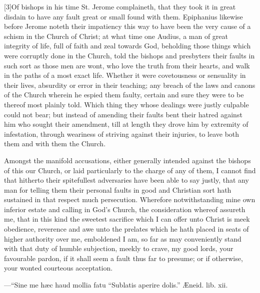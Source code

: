 [3]Of bishops in his time St. Jerome complaineth, that they took it in great disdain to have any fault great or small found with them. Epiphanius likewise before Jerome noteth their impatiency this way to have been the very cause of a schism in the Church of Christ; at what time one Audius, a man of great integrity of life, full of faith and zeal towards God, beholding those things which were corruptly done in the Church, told the bishops and presbyters their faults in such sort as those men are wont, who love the truth from their  hearts, and walk in the paths of a most exact life. Whether it were covetousness or sensuality in their lives, absurdity or error in their teaching; any breach of the laws and canons of the Church wherein he espied them faulty, certain and sure they were to be thereof most plainly told. Which thing they whose dealings were justly culpable could not bear; but instead of amending their faults bent their hatred against him who sought their amendment, till at length they drove him by extremity of infestation, through weariness of striving against their injuries, to leave both them and with them the Church.

Amongst the manifold accusations, either generally intended against the bishops of this our Church, or laid particularly to the charge of any of them, I cannot find that hitherto their spitefullest adversaries have been able to say justly, that any man for telling them their personal faults in good and Christian sort hath sustained in that respect much persecution. Wherefore notwithstanding mine own inferior estate and calling in God’s Church, the consideration whereof assureth me, that in this kind the sweetest sacrifice which I can offer unto Christ is meek obedience, reverence and awe unto the prelates which he hath placed in seats of higher authority over me, emboldened I am, so far as may conveniently stand with that duty of humble subjection, meekly to crave, my good lords, your favourable pardon, if it shall seem a fault thus far to presume; or if otherwise, your wonted courteous acceptation.

—“Sine me hæc haud mollia fatu
“Sublatis aperire dolis.”
Æneid. lib. xii. 

